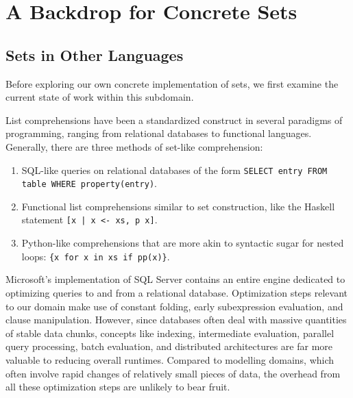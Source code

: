 \documentclass{article}
\begin{document}

\section{A Backdrop for Concrete Sets}

\subsection{Sets in Other Languages}
Before exploring our own concrete implementation of sets, we first examine the current state of work within this subdomain.

List comprehensions have been a standardized construct in several paradigms of programming, ranging from relational databases to functional languages. Generally, there are three methods of set-like comprehension:
\begin{enumerate}
  \item SQL-like queries on relational databases of the form \texttt{SELECT entry FROM table WHERE property(entry)}.
  \item Functional list comprehensions similar to set construction, like the Haskell statement \texttt{[x | x <- xs, p x]}.
  \item Python-like comprehensions that are more akin to syntactic sugar for nested loops: \texttt{\{x for x in xs if pp(x)\}}.
\end{enumerate}

Microsoft's implementation of SQL Server contains an entire engine dedicated to optimizing queries to and from a relational database. Optimization steps relevant to our domain make use of constant folding, early subexpression evaluation, and clause manipulation. However, since databases often deal with massive quantities of stable data chunks, concepts like indexing, intermediate evaluation, parallel query processing, batch evaluation, and distributed architectures are far more valuable to reducing overall runtimes. Compared to modelling domains, which often involve rapid changes of relatively small pieces of data, the overhead from all these optimization steps are unlikely to bear fruit.
\end{document}
